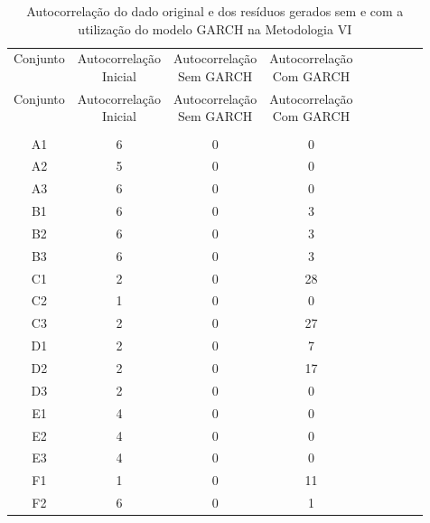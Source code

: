 \begin{center}
\begin{longtable}{ccccc|cccc}
\toprule
\rowcolor{white}
\caption[Metodologia VI: evolução da autocorrelação]{Autocorrelação do dado
original e dos resíduos gerados sem e com a utilização do modelo GARCH na
Metodologia VI} \label{tab:EvolucaoAutocorrelacaoMet6}\\
\midrule
Conjunto & \specialcell{Autocorrelação\\Inicial} & \specialcell{Autocorrelação\\Sem
GARCH} & \specialcell{Autocorrelação\\Com GARCH} \\
\midrule
\endfirsthead 
\midrule
\rowcolor{white}
Conjunto & \specialcell{Autocorrelação\\Inicial} & \specialcell{Autocorrelação\\Sem
GARCH} & \specialcell{Autocorrelação\\Com GARCH} \\
\toprule
\endhead
\midrule \\ %
\endfoot
\bottomrule 
\endlastfoot
    A1    & 6     & 0     & 0 \\
    A2    & 5     & 0     & 0 \\
    A3    & 6     & 0     & 0 \\
    B1    & 6     & 0     & 3 \\
    B2    & 6     & 0     & 3 \\
    B3    & 6     & 0     & 3 \\
    C1    & 2     & 0     & 28 \\
    C2    & 1     & 0     & 0 \\
    C3    & 2     & 0     & 27 \\
    D1    & 2     & 0     & 7 \\
    D2    & 2     & 0     & 17 \\
    D3    & 2     & 0     & 0 \\
    E1    & 4     & 0     & 0 \\
    E2    & 4     & 0     & 0 \\
    E3    & 4     & 0     & 0 \\
    F1    & 1     & 0     & 11 \\
    F2    & 6     & 0     & 1 \\

\end{longtable}
\end{center}
